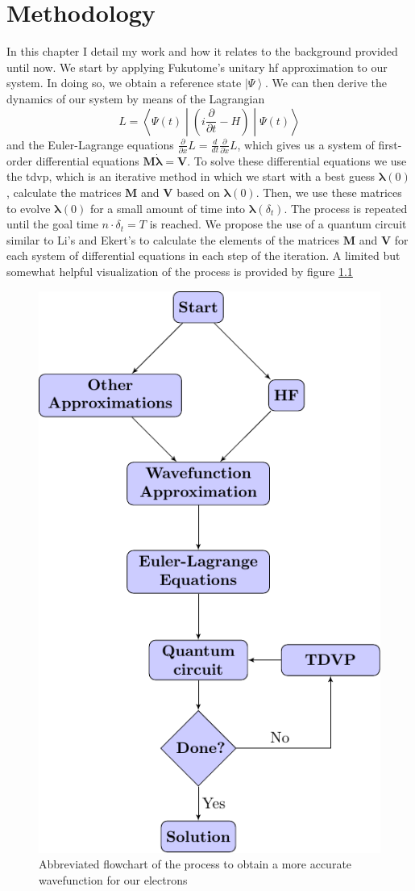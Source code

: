 \documentclass{aux/ttuthes2007}
\newcommand{\ket}[1]{\ensuremath{\left|#1\right\rangle}}
\newcommand{\sandwich}[3]{\left< #1 \middle\vert #2 \middle\vert #3 \right>}
\newcommand{\paren}[1]{\left( #1 \right)}
\newcommand{\ddt}{\frac{d}{dt}}
\newcommand{\pdt}{\frac{\partial}{\partial t}}
\newcommand{\pd}[1]{\frac{\partial}{\partial #1}}
\begin{document}
\chapter{\textbf{Methodology}}\label{chap:methodology}

In this chapter I detail my work and how it relates to the background provided until now.
We start by applying Fukutome's \cite{fukutome} unitary \gls{hf} approximation to our system. In doing so, we obtain a reference state $\ket\Psi$.
We can then derive the dynamics of our system by means of the Lagrangian
\[
	L = \sandwich {\Psi(t)} {\paren{i\pdt - H}} {\Psi(t)}
\]
and the Euler-Lagrange equations $\pd{x} L = \ddt \pd{\dot x} L$, which gives us a system of first-order differential equations $\bm M \dot{\bm \lambda} = \bm V$.
To solve these differential equations we use the \gls{tdvp}, which is an iterative method in which we start with a best guess $\bm \lambda(0)$, calculate the matrices $\bm M$ and $\bm V$ based on $\bm \lambda(0)$. Then, we use these matrices to evolve $\bm \lambda(0)$ for a small amount of time into $\bm \lambda(\delta_t)$. The process is repeated until the goal time $n\cdot\delta_t = T$ is reached. We propose the use of a quantum circuit similar to Li's \cite{benjamin} and Ekert's  to calculate the elements of the matrices $\bm M$ and $\bm V$ for each system of differential equations in each step of the iteration. A limited but somewhat helpful visualization of the process is provided by figure \ref{fig:flowchart1}

\begin{figure}[hb!]
	\centering
  \includegraphics[width=.7\linewidth]{flowcharts/flowchart1.pdf}
  \caption{Abbreviated flowchart of the process to obtain a more accurate wavefunction for our electrons}
  \label{fig:flowchart1}
\end{figure}
\end{document}
